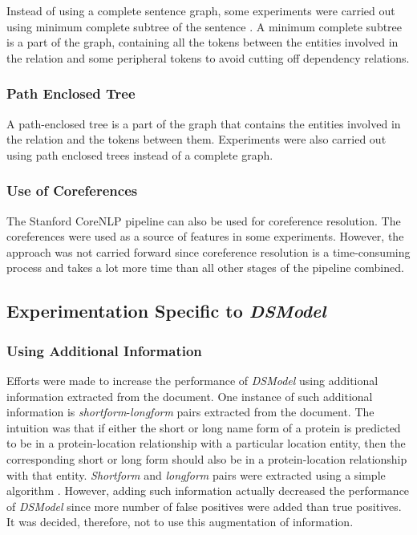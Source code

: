Instead of using a complete sentence graph, some experiments were carried out using minimum complete subtree \cite{jiang2007systematic} of the sentence . A minimum complete subtree is a part of the graph, containing all the tokens between the entities involved in the relation and some peripheral tokens to avoid cutting off dependency relations.

\subsubsection*{Path Enclosed Tree}

A path-enclosed tree is a part of the graph that contains the entities involved in the relation and the tokens between them. Experiments were also carried out using path enclosed trees instead of a complete graph.

\subsubsection*{Use of Coreferences} \label{subsubsec:coref}

The Stanford CoreNLP pipeline \cite{manning2014stanford} can also be used for coreference resolution. The coreferences were used as a source of features in some experiments. However, the approach was not carried forward since coreference resolution is a time-consuming process and takes a lot more time than all other stages of the pipeline combined.

\subsection*{Experimentation Specific to \textit{DSModel}}

\subsubsection*{Using Additional Information}

Efforts were made to increase the performance of \textit{DSModel} using additional information extracted from the document. One instance of such additional information is \emph{shortform}-\emph{longform} pairs extracted from the document. The intuition was that if either the short or long name form of a protein is predicted to be in a protein-location relationship with a particular location entity, then the corresponding short or long form should also be in a protein-location relationship with that entity. \emph{Shortform} and \emph{longform} pairs were extracted using a simple algorithm \cite{hearst2003simple}. However, adding such information actually decreased the performance of \textit{DSModel} since more number of false positives were added than true positives. It was decided, therefore, not to use this augmentation of information.

